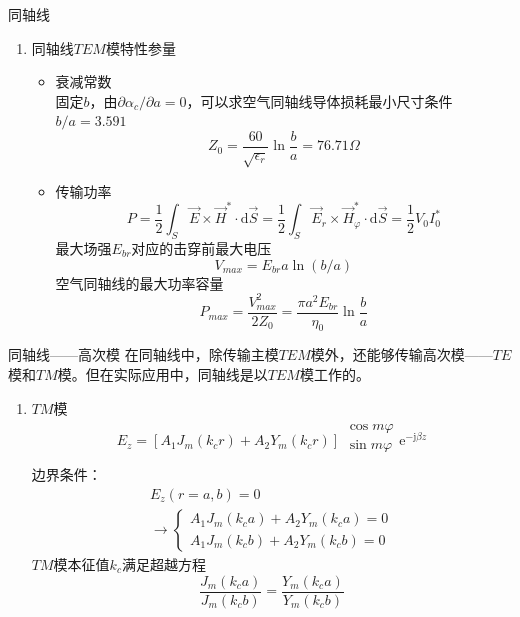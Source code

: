 \begin{frame}{同轴线}
    \begin{enumerate}
        \resume
        \item 同轴线$TEM$模特性参量
        \begin{itemize}
            \item 衰减常数\\
            固定$b$，由$\partial\alpha_c/\partial a=0$，可以求空气同轴线导体损耗最小尺寸条件$b/a=3.591$
            $$Z_0=\frac{60}{\sqrt{\epsilon_r}}\ln\frac{b}{a}=76.71\Omega$$
            \item 传输功率
            $$P=\frac{1}{2}\int_S \vec{E}\times\vec{H}^*\cdot\mathrm{d}\vec{S}=\frac{1}{2}\int_S\vec{E}_r\times\vec{H}_{\varphi}^*\cdot\mathrm{d}\vec{S}=\frac{1}{2}V_0I_0^*$$
            最大场强$E_{br}$对应的击穿前最大电压
            $$V_{max}=E_{br}a\ln(b/a)$$
            空气同轴线的最大功率容量
            $$P_{max}=\frac{V_{max}^2}{2Z_0}=\frac{\pi a^2E_{br}}{\eta_0}\ln\frac{b}{a}$$
        \end{itemize}
    \end{enumerate}
\end{frame}

\begin{frame}{同轴线——高次模}
    在同轴线中，除传输主模$TEM$模外，还能够传输高次模——$TE$模和$TM$模。但在实际应用中，同轴线是以$TEM$模工作的。
    \begin{enumerate}
        \item $TM$模
        \begin{gather*}
            E_z=[A_1J_m(k_cr)+A_2Y_m(k_cr)]
            \begin{matrix*}
                \cos m\varphi\\
                \sin m\varphi\\
            \end{matrix*}
            \mathrm{e}^{-\mathrm{j}\beta z}
        \end{gather*}
        边界条件：
        \begin{gather*}
            E_z(r=a,b)=0\\
            \rightarrow
            \begin{cases}
                A_1J_m(k_ca)+A_2Y_m(k_ca)=0\\
                A_1J_m(k_cb)+A_2Y_m(k_cb)=0
            \end{cases}
        \end{gather*}
        $TM$模本征值$k_c$满足超越方程
        $$\frac{J_m(k_ca)}{J_m(k_cb)}=\frac{Y_m(k_ca)}{Y_m(k_cb)}$$
    \end{enumerate}
\end{frame}

